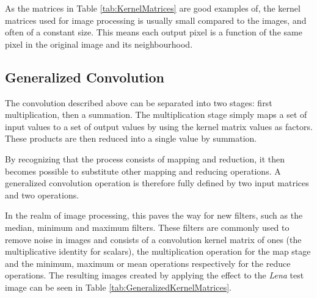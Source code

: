 As the matrices in Table \ref{tab:KernelMatrices} are good examples of, the kernel matrices used for image processing is usually small compared to the images, and often of a constant size.
This means each output pixel is a function of the same pixel in the original image and its neighbourhood.

\subsection{Generalized Convolution}
The convolution described above can be separated into two stages: first multiplication, then a summation.
The multiplication stage simply maps a set of input values to a set of output values by using the kernel matrix values as factors.
These products are then reduced into a single value by summation.

By recognizing that the process consists of mapping and reduction,
it then becomes possible to substitute other mapping and reducing operations.
A generalized convolution operation is therefore fully defined by two input matrices and two operations.

In the realm of image processing, this paves the way for new filters, such as the median, minimum and maximum filters.
These filters are commonly used to remove noise in images and consists of a convolution kernel matrix of ones (the multiplicative identity for scalars),
the multiplication operation for the map stage and the minimum, maximum or mean operations respectively for the reduce operations.
The resulting images created by applying the effect to the \textit{Lena} test image can be seen in Table \ref{tab:GeneralizedKernelMatrices}.

